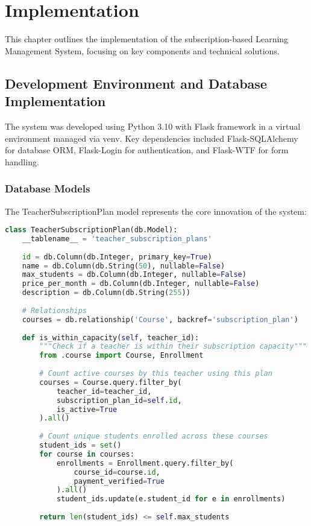 \section{Implementation}

This chapter outlines the implementation of the subscription-based Learning Management System, focusing on key components and technical solutions.

\subsection{Development Environment and Database Implementation}

The system was developed using Python 3.10 with Flask framework in a virtual environment managed via venv. Key dependencies included Flask-SQLAlchemy for database ORM, Flask-Login for authentication, and Flask-WTF for form handling.

\subsubsection{Database Models}

The TeacherSubscriptionPlan model represents the core innovation of the system:

\begin{lstlisting}[language=Python, caption=TeacherSubscriptionPlan Model, label=lst:subscription-model]
class TeacherSubscriptionPlan(db.Model):
    __tablename__ = 'teacher_subscription_plans'
    
    id = db.Column(db.Integer, primary_key=True)
    name = db.Column(db.String(50), nullable=False)
    max_students = db.Column(db.Integer, nullable=False)
    price_per_month = db.Column(db.Integer, nullable=False)
    description = db.Column(db.String(255))
    
    # Relationships
    courses = db.relationship('Course', backref='subscription_plan')
    
    def is_within_capacity(self, teacher_id):
        """Check if a teacher is within their subscription capacity"""
        from .course import Course, Enrollment
        
        # Count active courses by this teacher using this plan
        courses = Course.query.filter_by(
            teacher_id=teacher_id,
            subscription_plan_id=self.id,
            is_active=True
        ).all()
        
        # Count unique students enrolled across these courses
        student_ids = set()
        for course in courses:
            enrollments = Enrollment.query.filter_by(
                course_id=course.id,
                payment_verified=True
            ).all()
            student_ids.update(e.student_id for e in enrollments)
        
        return len(student_ids) <= self.max_students
\end{lstlisting}

